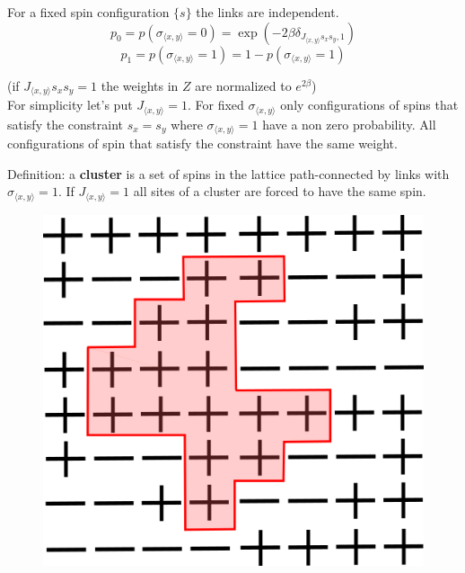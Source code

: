 \documentclass[12pt,handout]{beamer}
\begin{document}
\begin{frame}
\begin{center}

For a fixed spin configuration $\lbrace s \rbrace$ the links are independent.
\[
p_0 = p \left( \sigma_{\langle x, y \rangle} = 0 \right)  = \exp \left( - 2 \beta \delta_{J_{\langle x, y \rangle} s_x s_y, 1} \right)
\]
\[
p_1 = p \left( \sigma_{\langle x, y \rangle} = 1 \right) = 1 - p \left( \sigma_{\langle x, y \rangle} = 1 \right)
\]

(if $J_{\langle x, y \rangle} s_x s_y = 1$ the weights in $Z$ are normalized to $e^{2 \beta}$)\\
\vspace{30pt}
For simplicity let's put $J_{\langle x, y \rangle} = 1$. For fixed $\sigma_{\langle x, y \rangle}$ only
configurations of spins that satisfy the constraint $s_x = s_y$ where $\sigma_{\langle x, y \rangle} = 1$ have a non zero probability. All configurations of spin that satisfy the constraint have the same weight.

\end{center}
\end{frame}

\begin{frame}
\begin{center}

Definition: a \textbf{cluster} is a set of spins in the lattice path-connected by links with $\sigma_{\langle x, y \rangle} = 1$. If $J_{\langle x, y \rangle} = 1$ all sites of a cluster are forced to have the same spin.

\begin{figure}[!htb]
\centering
\includegraphics[scale=0.5]{esempioCluster.png}
\end{figure}

\end{center}
\end{frame}
\end{document}
